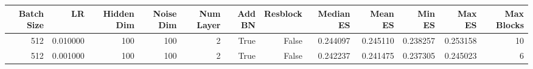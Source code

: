 \begin{tabular}{rrrrrrrrrrrr}
\toprule
Batch Size & LR & Hidden Dim & Noise Dim & Num Layer & Add BN & Resblock & Median ES & Mean ES & Min ES & Max ES & Max Blocks \\
\midrule
512 & 0.010000 & 100 & 100 & 2 & True & False & 0.244097 & 0.245110 & 0.238257 & 0.253158 & 10 \\
512 & 0.001000 & 100 & 100 & 2 & True & False & 0.242237 & 0.241475 & 0.237305 & 0.245023 & 6 \\
\bottomrule
\end{tabular}
